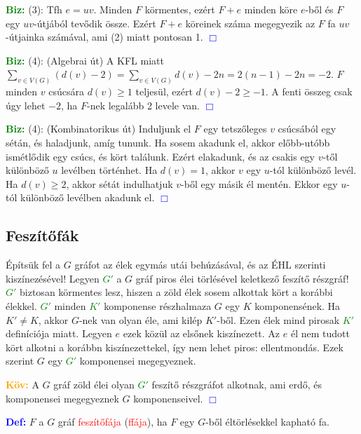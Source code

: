 \documentclass[../szamtud.tex]{subfiles}
\begin{document}
        \textcolor{green}{\textbf{Biz:}} (3): Tfh $e=uv$. Minden $F$ körmentes, ezért $F+e$ minden köre $e$-ből és $F$ egy $uv$-útjából tevődik össze. Ezért $F+e$ köreinek száma megegyezik az $F$ fa $uv$-útjainka számával, ami (2) miatt pontosan 1. \textcolor{blue}{$\Box$}

        \textcolor{green}{\textbf{Biz:}} (4): (Algebrai út) A KFL miatt $\sum_{v\in V(G)}(d(v)-2)=\sum_{v\in V(G)}d(v)-2n=2(n-1)-2n=-2$. $F$ minden $v$ csúcsára $d(v) \geq 1$ teljesül, ezért $d(v) - 2 \geq -1$. A fenti összeg csak úgy lehet $-2$, ha $F$-nek legalább 2 levele van. \textcolor{blue}{$\Box$}

        \textcolor{green}{\textbf{Biz:}} (4): (Kombinatorikus út) Induljunk el $F$ egy tetszőleges $v$ csúcsából egy sétán, és haladjunk, amíg tununk. Ha sosem akadunk el, akkor előbb-utóbb ismétlődik egy csúcs, és kört találunk. Ezért elakadunk, és az csakis egy $v$-től különböző $u$ levélben történhet. Ha $d(v)=1$, akkor $v$ egy $u$-tól különböző levél. Ha $d(v) \geq 2$, akkor sétát indulhatjuk $v$-ből egy másik él mentén. Ekkor egy $u$-tól különböző levélben akadunk el. \textcolor{blue}{$\Box$}

    \subsection{Feszítőfák}

        Építsük fel a $G$ gráfot az élek egymás utái behúzásával, és az ÉHL szerinti kiszínezésével! Legyen \textcolor{green}{$G'$} a $G$ gráf piros élei törlésével keletkező feszítő részgráf! \textcolor{green}{$G'$} biztosan körmentes lesz, hiszen a zöld élek sosem alkottak kört a korábbi élekkel. \textcolor{green}{$G'$} minden \textcolor{green}{$K'$} komponense részhalmaza $G$ egy $K$ komponensének. Ha $K' \neq K$, akkor $G$-nek van olyan éle, ami kilép $K'$-ből. Ezen élek mind pirosak \textcolor{green}{$K'$} definíciója miatt. Legyen $e$ ezek közül az elsőnek kiszínezett. Az $e$ él nem tudott kört alkotni a korábbn kiszínezettekel, így nem lehet piros: ellentmondás. Ezek szerint $G$ egy \textcolor{green}{$G'$} komponensei megegyeznek.

        \textcolor{orange}{\textbf{Köv:}} A $G$ gráf zöld élei olyan \textcolor{green}{$G'$} feszítő részgráfot alkotnak, ami erdő, és komponensei megegyeznek $G$ komponenseivel. \textcolor{blue}{$\Box$}

        \textcolor{blue}{\textbf{Def:}} $F$ a $G$ gráf \textcolor{red}{feszítőfája} (\textcolor{red}{ffája}), ha $F$ egy $G$-ből éltörlésekkel kapható fa.
\end{document}
